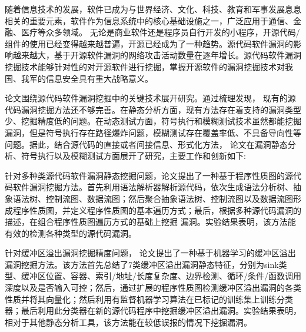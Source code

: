 \begin{cabstract}
随着信息技术的发展，软件已成为与世界经济、文化、科技、教育和军事发展息息相关的重要元素，软件作为信息系统中的核心基础设施之一，广泛应用于通信、金融、医疗等众多领域。 %
无论是商业软件还是程序员自行开发的小程序，开源代码/组件的使用已经变得越来越普遍，开源已经成为了一种趋势。源代码软件漏洞的影响越来越大，基于开源软件漏洞的网络攻击活动数量在逐年增长。源代码软件漏洞挖掘技术能够针对性的对开源软件进行挖掘，掌握开源软件的漏洞挖掘技术对我国、我军的信息安全具有重大战略意义。

论文围绕源代码软件漏洞挖掘中的关键技术展开研究。通过梳理发现， %
现有的源代码漏洞挖掘方法还不够完善。在静态分析方面，现有方法存在着支持的漏洞类型少、挖掘精度低的问题。在动态测试方面，符号执行和模糊测试技术虽然都能挖掘漏洞，但是符号执行存在路径爆炸问题，模糊测试存在覆盖率低、不具备导向性等问题。据此，结合源代码的直接或者间接信息、形式化方法，
论文在漏洞静态分析、符号执行以及模糊测试方面展开了研究，主要工作和创新如下:


针对多种类源代码软件漏洞静态挖掘问题，论文提出了一种基于程序性质图的源代码软件漏洞挖掘方法。首先利用语法解析器解析源代码，依次生成语法分析树、抽象语法树、控制流图、数据流图；然后聚合抽象语法树、控制流图以及数据流图形成程序性质图，并定义程序性质图的基本遍历方式；最后，根据多种源代码漏洞的描述，在组合程序性质图遍历方式的基础上挖掘
漏洞。实验结果表明，该方法能有效的检测各种类型的源代码漏洞。

针对缓冲区溢出漏洞挖掘精度问题，
论文提出了一种基于机器学习的缓冲区溢出漏洞挖掘方法。该方法首先总结了7类缓冲区溢出漏洞静态特征，分别为sink类型、缓冲区位置、容器、索引/地址/长度复杂度、边界检测、循环/条件/函数调用深度以及是否输入可控；然后，通过扩展的程序性质图检测缓冲区溢出漏洞的各类性质并将其向量化；然后利用有监督机器学习算法在已标记的训练集上训练分类器；最后利用此分类器在新的源代码程序中挖掘缓冲区溢出漏洞。实验结果表明，相对于其他静态分析工具，该方法能在较低误报的情况下挖掘漏洞。


\end{cabstract}
